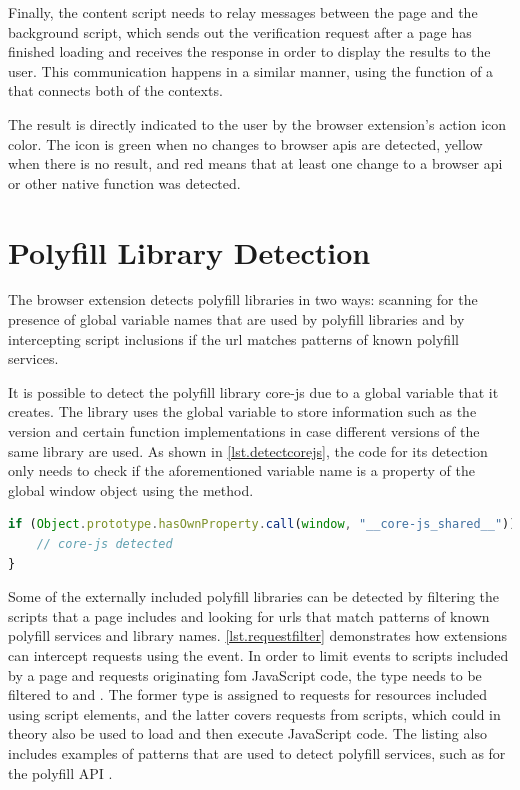 Finally, the content script needs to relay messages between the page and the background script, which sends out the verification request after a page has finished loading and receives the response in order to display the results to the user. This communication happens in a similar manner, using the  function of a  that connects both of the contexts.

The result is directly indicated to the user by the browser extension's action icon color. The icon is green when no changes to browser \acsp{api} are detected, yellow when there is no result, and red means that at least one change to a browser \acs{api} or other native function was detected.



\section{Polyfill Library Detection}
\label{sec.browserExtensionPolyfillDetection}

The browser extension detects polyfill libraries in two ways: scanning for the presence of global variable names that are used by polyfill libraries and by intercepting script inclusions if the \acs{url} matches patterns of known polyfill services.

It is possible to detect the polyfill library core-js due to a global variable that it creates. The library uses the global variable  to store information such as the version and certain function implementations in case different versions of the same library are used. As shown in \autoref{lst.detectcorejs}, the code for its detection only needs to check if the aforementioned variable name is a property of the global window object using the  method.

\begin{lstlisting}[language=JavaScript,label={lst.detectcorejs},caption={Detection of the core-js library}]
if (Object.prototype.hasOwnProperty.call(window, "__core-js_shared__")) {
    // core-js detected
}
\end{lstlisting}

Some of the externally included polyfill libraries can be detected by filtering the scripts that a page includes and looking for \acsp{url} that match patterns of known polyfill services and library names. \autoref{lst.requestfilter} demonstrates how extensions can intercept requests using the  event. In order to limit events to scripts included by a page and requests originating fom JavaScript code, the type needs to be filtered to  and . The former type is assigned to requests for resources included using script elements, and the latter covers requests from scripts, which could in theory also be used to load and then execute JavaScript code. The listing also includes examples of patterns that are used to detect polyfill services, such as  for the polyfill API .

